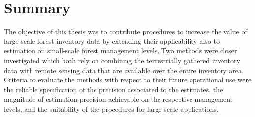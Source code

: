 \chapter*{Summary}
\label{chap:Summary}

The objective of this thesis was to contribute procedures to increase the value of large-scale forest inventory data by extending their applicability also to estimation on small-scale forest management levels. Two methods were closer investigated which both rely on combining the terrestrially gathered inventory data with remote sensing data that are available over the entire inventory area. Criteria to evaluate the methods with respect to their future operational use were the reliable specification of the precision associated to the estimates, the magnitude of estimation precision achievable on the respective management levels, and the suitability of the procedures for large-scale applications.\par

